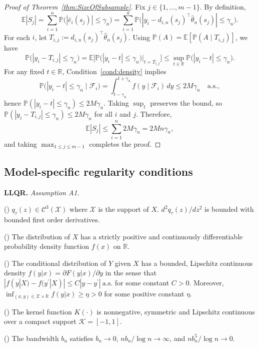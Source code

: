 \documentclass[lineno]{biometrika}
\begin{document}
\begin{proof}[Proof of Theorem~\ref{thm:SizeOfSubsample}]
Fix $j\in\{1,\ldots,m-1\}$. By definition,
\[
\mathbb E|S_j|=\sum_{i=1}^n \mathbb P\big(|\hat e_i(s_j)|\le \gamma_n\big)
=\sum_{i=1}^n \mathbb P\big(|y_i-d_{i,n}(s_j)^\top\hat\theta_n(s_j)|\le \gamma_n\big).
\]
For each $i$, let $T_{i,j}:=d_{i,n}(s_j)^\top\hat\theta_n(s_j)$. Using
$\mathbb P(A)=\mathbb E[\mathbb P(A\mid T_{i,j})]$, we have
\[
\mathbb P\big(|y_i-T_{i,j}|\le \gamma_n\big)
=\mathbb E\Big[\mathbb P\big(|y_i-t|\le \gamma_n\big)\Big|_{t=T_{i,j}}\Big]
\le \sup_{t\in\mathbb R}\mathbb P\big(|y_i-t|\le \gamma_n\big).
\]
For any fixed $t\in\mathbb R$, Condition~\ref{cond:density} implies
\[
\mathbb P\big(|y_i-t|\le \gamma_n\mid \mathcal F_i\big)
=\int_{t-\gamma_n}^{t+\gamma_n} f(y\mid \mathcal F_i)\,dy
\le 2M\gamma_n\quad \text{a.s.},
\]
hence $\mathbb P(|y_i-t|\le \gamma_n)\le 2M\gamma_n$. Taking $\sup_t$ preserves the bound, so
$\mathbb P(|y_i-T_{i,j}|\le \gamma_n)\le 2M\gamma_n$ for all $i$ and $j$. Therefore,
\[
\mathbb E|S_j|\le \sum_{i=1}^n 2M\gamma_n = 2Mn\gamma_n,
\]
and taking $\max_{1\le j\le m-1}$ completes the proof.
\end{proof}

\subsection{Model-specific regularity conditions}\label{app:model-conditions}

\noindent\textbf{LLQR.}
\textit{Assumption A1.}

() $q_\tau(z)\in \mathcal{C}^3(\mathcal{X})$ where $\mathcal{X}$ is the support of $X$. $d^2 q_\tau(z)/d z^2$
is bounded with bounded first order derivatives.

() The distribution of $X$ has a strictly positive and continuously differentiable probability density
function $f(x)$ on $\mathbb{R}$.

() The conditional distribution of $Y$ given $X$ has a bounded, Lipschitz continuous density
$f(y|x)=\partial F(y|x)/\partial y$ in the sense that $|f(y|X)-f(y^\prime|X)|\le C|y-y^\prime|\ \text{a.s.}$ for some
constant $C>0$. Moreover, $\inf_{(x,y)\in\mathcal{X}\times\mathbb{R}}f(y|x)\ge\eta>0$ for some positive constant
$\eta$.

() The kernel function $K(\cdot)$ is nonnegative, symmetric and Lipschitz continuous over a compact
support $\mathcal{K}=[-1,1]$.

() The bandwidth $b_n$ satisfies $b_n\to 0$, $nb_n/\log n\to \infty$, and $nb_n^5/\log n\to 0$.
\end{document}
